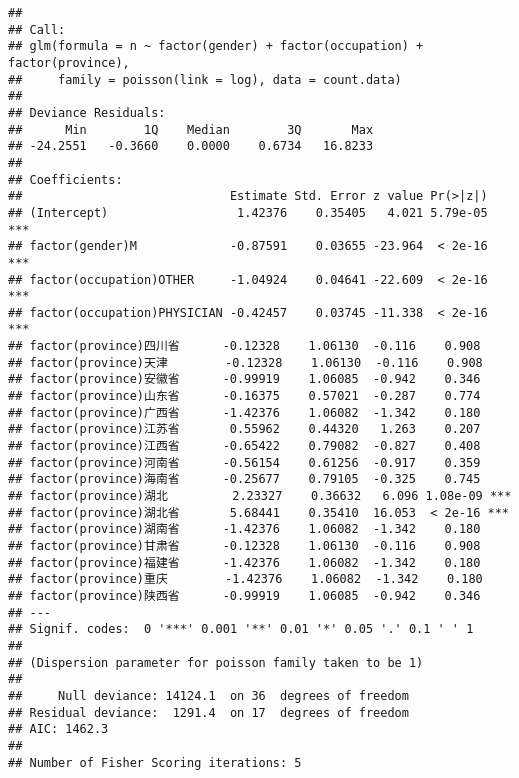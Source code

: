 \documentclass[]{article}
\newenvironment{Shaded}{\begin{snugshade}}{\end{snugshade}}
\newcommand{\KeywordTok}[1]{\textcolor[rgb]{0.13,0.29,0.53}{\textbf{#1}}}
\newcommand{\DataTypeTok}[1]{\textcolor[rgb]{0.13,0.29,0.53}{#1}}
\newcommand{\StringTok}[1]{\textcolor[rgb]{0.31,0.60,0.02}{#1}}
\newcommand{\OperatorTok}[1]{\textcolor[rgb]{0.81,0.36,0.00}{\textbf{#1}}}
\newcommand{\NormalTok}[1]{#1}
\begin{document}
\begin{Shaded}
\end{Shaded}

\begin{verbatim}
## 
## Call:
## glm(formula = n ~ factor(gender) + factor(occupation) + factor(province), 
##     family = poisson(link = log), data = count.data)
## 
## Deviance Residuals: 
##      Min        1Q    Median        3Q       Max  
## -24.2551   -0.3660    0.0000    0.6734   16.8233  
## 
## Coefficients:
##                             Estimate Std. Error z value Pr(>|z|)    
## (Intercept)                  1.42376    0.35405   4.021 5.79e-05 ***
## factor(gender)M             -0.87591    0.03655 -23.964  < 2e-16 ***
## factor(occupation)OTHER     -1.04924    0.04641 -22.609  < 2e-16 ***
## factor(occupation)PHYSICIAN -0.42457    0.03745 -11.338  < 2e-16 ***
## factor(province)四川省      -0.12328    1.06130  -0.116    0.908    
## factor(province)天津        -0.12328    1.06130  -0.116    0.908    
## factor(province)安徽省      -0.99919    1.06085  -0.942    0.346    
## factor(province)山东省      -0.16375    0.57021  -0.287    0.774    
## factor(province)广西省      -1.42376    1.06082  -1.342    0.180    
## factor(province)江苏省       0.55962    0.44320   1.263    0.207    
## factor(province)江西省      -0.65422    0.79082  -0.827    0.408    
## factor(province)河南省      -0.56154    0.61256  -0.917    0.359    
## factor(province)海南省      -0.25677    0.79105  -0.325    0.745    
## factor(province)湖北         2.23327    0.36632   6.096 1.08e-09 ***
## factor(province)湖北省       5.68441    0.35410  16.053  < 2e-16 ***
## factor(province)湖南省      -1.42376    1.06082  -1.342    0.180    
## factor(province)甘肃省      -0.12328    1.06130  -0.116    0.908    
## factor(province)福建省      -1.42376    1.06082  -1.342    0.180    
## factor(province)重庆        -1.42376    1.06082  -1.342    0.180    
## factor(province)陕西省      -0.99919    1.06085  -0.942    0.346    
## ---
## Signif. codes:  0 '***' 0.001 '**' 0.01 '*' 0.05 '.' 0.1 ' ' 1
## 
## (Dispersion parameter for poisson family taken to be 1)
## 
##     Null deviance: 14124.1  on 36  degrees of freedom
## Residual deviance:  1291.4  on 17  degrees of freedom
## AIC: 1462.3
## 
## Number of Fisher Scoring iterations: 5
\end{verbatim}
\end{document}
